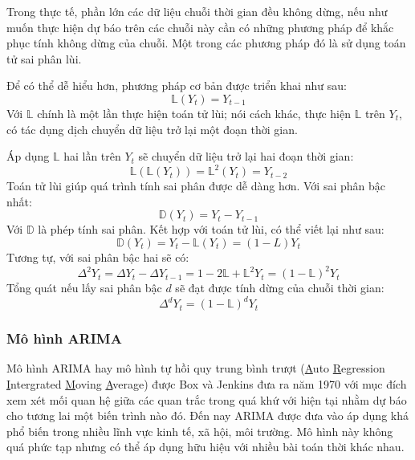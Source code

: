 \documentclass[12pt,a4paper]{report}
\begin{document}
Trong thực tế, phần lớn các dữ liệu chuỗi thời gian đều không dừng, nếu như muốn thực hiện dự báo trên các chuỗi này cần có những phương pháp để khắc phục tính không dừng của chuỗi. Một trong các phương pháp đó là sử dụng toán tử sai phân lùi.

Để có thể dễ hiểu hơn, phương pháp cơ bản được triển khai như sau:
	\begin{equation}
		\mathbb{L}(Y_t) = Y_{t-1}
	\end{equation}
Với $\mathbb{L}$ chính là một lần thực hiện toán tử lùi; nói cách khác, thực hiện $\mathbb{L}$ trên $Y_t$, có tác dụng dịch chuyển dữ liệu trở lại một đoạn thời gian.

Áp dụng $\mathbb{L}$ hai lần trên $Y_t$ sẽ chuyển dữ liệu trở lại hai đoạn thời gian:
	\begin{equation}
		\mathbb{L}(\mathbb{L}(Y_t)) = \mathbb{L}^2(Y_t) = Y_{t-2}
	\end{equation}
Toán tử lùi giúp quá trình tính sai phân được dễ dàng hơn. Với sai phân bậc nhất:
	\begin{equation}
		\mathbb{D}(Y_t) = Y_t - Y_{t-1}
	\end{equation}
Với $\mathbb{D}$ là phép tính sai phân. Kết hợp với toán tử lùi, có thể viết lại như sau:
	\begin{equation}
		\mathbb{D}(Y_t) = Y_t - \mathbb{L}(Y_t) = (1 - L)Y_t
	\end{equation}
Tương tự, với sai phân bậc hai sẽ có:
	\begin{equation}
		\Delta^2Y_t = \Delta Y_t - \Delta Y_{t-1} = 1-2\mathbb{L}+\mathbb{L}^2 Y_t = (1 - \mathbb{L})^2Y_t
	\end{equation}
Tổng quát nếu lấy sai phân bậc $d$ sẽ đạt được tính dừng của chuỗi thời gian:
	\begin{equation}
		\Delta^dY_t = (1 - \mathbb{L})^dY_t
	\end{equation}

\subsubsection{Mô hình ARIMA}
Mô hình ARIMA hay mô hình tự hồi quy trung bình trượt (\underline Auto \underline Regression  \underline Intergrated \underline Moving \underline Average) được Box và Jenkins đưa ra năm 1970 với mục đích xem xét mối quan hệ giữa các quan trắc trong quá khứ với hiện tại nhằm dự báo cho tương lai một biến trình nào đó. Đến nay ARIMA được đưa vào áp dụng khá phổ biến trong nhiều lĩnh vực kinh tế, xã hội, môi trường. Mô hình này không quá phức tạp nhưng có thể áp dụng hữu hiệu với nhiều bài toán thời khác nhau.
\end{document}
